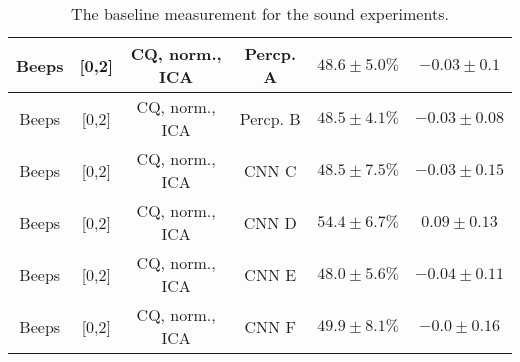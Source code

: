 \begin{table}[!htb]
{\begin{tabular}{c|c|c|c|c|c}
    \hline
    Beeps               & [0,2]                                         & CQ, norm., ICA             & Percp. A              &  $48.6 \pm 5.0\%$     & $-0.03 \pm 0.1$\\  
    \hline
    Beeps               & [0,2]                                         & CQ, norm., ICA             & Percp. B              &  $48.5 \pm 4.1\%$     & $-0.03 \pm 0.08$\\ 
    \hline
    Beeps               & [0,2]                                         & CQ, norm., ICA             & CNN C                 &  $48.5 \pm 7.5\%$     & $-0.03 \pm 0.15$\\ 
    \hline
    Beeps               & [0,2]                                         & CQ, norm., ICA             & CNN D                 &  $54.4 \pm 6.7\%$     & $0.09 \pm 0.13$\\  
    \hline
    Beeps               & [0,2]                                         & CQ, norm., ICA             & CNN E                 &  $48.0 \pm 5.6\%$     & $-0.04 \pm 0.11$\\ 
    \hline
    Beeps               & [0,2]                                         & CQ, norm., ICA             & CNN F                 &  $49.9 \pm 8.1\%$     & $-0.0 \pm 0.16$\\ 
    \hline
\end{tabular}
}
\caption{The baseline measurement for the sound experiments.}
\label{tab:sound-baseline-app}
\end{table}


